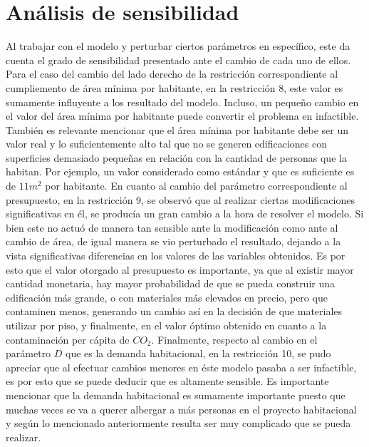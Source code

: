 \documentclass[letterpaper]{article}
\begin{document}
\newpage
\section{Análisis de sensibilidad}
Al trabajar con el modelo y perturbar ciertos parámetros en específico, este da cuenta el grado de sensibilidad presentado ante el cambio de cada uno de ellos. Para el caso del cambio del lado derecho de la restricción 
correspondiente al cumpliemento de área mínima por habitante, en la restricción 8, este valor es sumamente influyente a los resultado del modelo. Incluso, un pequeño cambio en el valor del área mínima por habitante puede 
convertir el problema en infactible. También es relevante mencionar que el área mínima por habitante debe ser un valor real y lo suficientemente alto tal que no se generen edificaciones con superficies demasiado pequeñas 
en relación con la cantidad de personas que la habitan. Por ejemplo, un valor considerado como estándar y que es suficiente es de $11 m^2$ por habitante. En cuanto al cambio del parámetro correspondiente al presupuesto, 
en la restricción 9, se observó que al realizar ciertas modificaciones significativas en él, se producía un gran cambio a la hora de resolver el modelo. Si bien este no actuó de manera tan sensible ante la modificación 
como ante al cambio de área, de igual manera se vio perturbado el resultado, dejando a la vista significativas diferencias en los valores de las variables obtenidos. Es por esto que el valor otorgado al presupuesto
es importante, ya que al existir mayor cantidad monetaria, hay mayor probabilidad de que se pueda construir una edificación más grande, o con materiales más elevados en precio, pero que contaminen menos, generando
un cambio así en la decisión de que materiales utilizar por piso, y finalmente, en el valor óptimo obtenido en cuanto a la contaminación per cápita de $CO_2$. Finalmente, respecto al cambio en el parámetro $D$ que es la demanda 
habitacional, en la restricción 10, se pudo apreciar que al efectuar cambios menores en éste modelo pasaba a ser infactible, es por esto que se puede deducir que es altamente sensible. Es importante mencionar que la demanda 
habitacional es sumamente importante puesto que muchas veces se va a querer albergar a más personas en el proyecto habitacional y según lo mencionado anteriormente resulta ser muy complicado que se pueda realizar.\\
\end{document}
